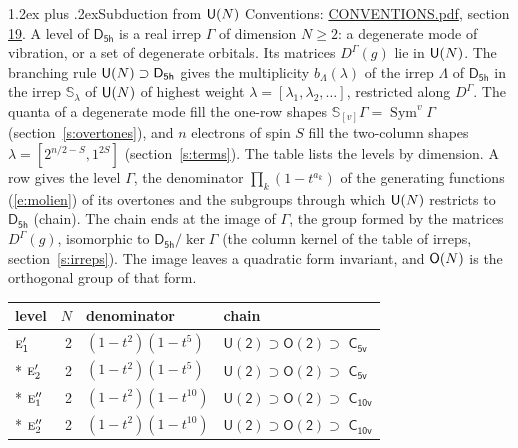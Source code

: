 \documentclass[10pt,a4paper]{article}
\makeatletter
\renewcommand\section{\@startsection{section}{1}{\z@}{-3ex plus -1ex minus -.2ex}%
  {1.2ex plus .2ex}{\normalfont\large\sffamily\bfseries\color{parttitle}}}
\numberwithin{equation}{section}
\newcommand{\grp}[1]{\mathsf{#1}}
\newcommand{\irr}[1]{\text{\normalfont\scshape #1}}
\newcommand{\repD}[1]{D^{#1}}
\newcommand{\schur}[1]{\mathbb{S}_{#1}}
\newcommand{\shape}[1]{[#1]}
\makeatother
\begin{document}
\section{Subduction from \texorpdfstring{$\grp{U(\mathnormal{N})}$}{U(N)}}\label{s:unitary}
Conventions: \href{../../CONVENTIONS.pdf}{CONVENTIONS.pdf}, section \href{../../CONVENTIONS.pdf\#conv.19}{19}.
\leavevmode\label{n:local.level.dimension}A level of $\grp{D_{5h}}$ is a real irrep $\Gamma$ of dimension $N \ge 2$: a degenerate mode of vibration, or a set of degenerate orbitals. \label{n:group.unitary}Its matrices $\repD{\Gamma}(g)$ lie in $\grp{U(\mathnormal{N})}$. \label{n:irrep.schur}\label{n:shape.partition}\label{n:local.partition}\label{n:function.multiplicity.unitary}The branching rule $\grp{U(\mathnormal{N})} \supset \grp{D_{5h}}$ gives the multiplicity $b_\Lambda(\lambda)$ of the irrep $\Lambda$ of $\grp{D_{5h}}$ in the irrep $\schur{\lambda}$ of $\grp{U(\mathnormal{N})}$ of highest weight $\lambda = \shape{\lambda_1, \lambda_2, \dots}$, restricted along $\repD{\Gamma}$. \label{n:local.partition.power}\label{n:local.electrons}\label{n:local.spin}The quanta of a degenerate mode fill the one-row shapes $\schur{\shape{v}}\Gamma = \operatorname{Sym}^{v}\Gamma$ (section~\ref{s:overtones}), and $n$ electrons of spin $S$ fill the two-column shapes $\lambda = \shape{2^{n/2-S}, 1^{2S}}$ (section~\ref{s:terms}).
The table lists the levels by dimension. \label{n:head.level}\label{n:head.denominator}\label{n:index.overtone.denominator}\label{n:head.chain}A row gives the level $\Gamma$, the denominator $\prod_k (1 - t^{a_k})$ of the generating functions (\ref{e:molien}) of its overtones and the subgroups through which $\grp{U(\mathnormal{N})}$ restricts to $\grp{D_{5h}}$ (chain). The chain ends at the image of $\Gamma$, the group formed by the matrices $\repD{\Gamma}(g)$, isomorphic to $\grp{D_{5h}}/\ker\Gamma$ (the column kernel of the table of irreps, section~\ref{s:irreps}). The image leaves a quadratic form invariant, and $\grp{O(\mathnormal{N})}$ is the orthogonal group of that form.
{\small\begin{longtable}{@{}lrll@{}}\toprule
level & $N$ & denominator & chain\\\midrule\endhead
\bottomrule\endfoot\endlastfoot
$\irr{e}_{1}'$ & 2 & $(1-t^{2})(1-t^{5})$ & $\grp{U(2)} \supset \grp{O(2)} \supset$ \href{C5v.pdf}{$\grp{C_{5v}}$}\\*
$\irr{e}_{2}'$ & 2 & $(1-t^{2})(1-t^{5})$ & $\grp{U(2)} \supset \grp{O(2)} \supset$ \href{C5v.pdf}{$\grp{C_{5v}}$}\\*
$\irr{e}_{1}''$ & 2 & $(1-t^{2})(1-t^{10})$ & $\grp{U(2)} \supset \grp{O(2)} \supset$ \href{C10v.pdf}{$\grp{C_{10v}}$}\\*
$\irr{e}_{2}''$ & 2 & $(1-t^{2})(1-t^{10})$ & $\grp{U(2)} \supset \grp{O(2)} \supset$ \href{C10v.pdf}{$\grp{C_{10v}}$}\\
\bottomrule\end{longtable}}
\end{document}
